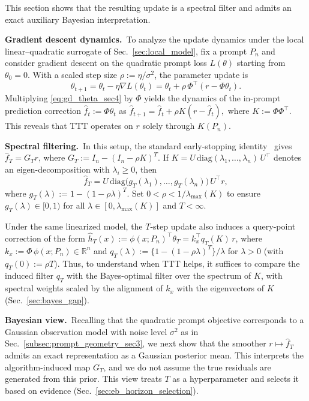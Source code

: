 \documentclass{article}
\theoremstyle{plain}
\theoremstyle{definition}
\theoremstyle{remark}
\begin{document}
This section shows that the resulting update is a spectral filter and admits an exact auxiliary Bayesian interpretation.

\textbf{Gradient descent dynamics.}\,
To analyze the update dynamics under the local linear--quadratic surrogate of Sec.~\ref{sec:local_model}, fix a prompt $P_n$ and consider gradient descent on the quadratic prompt loss $L(\theta)$ starting from $\theta_0=0$. With a scaled step size $\rho:=\eta/\sigma^2$, the parameter update is
\begin{equation}
    \theta_{t+1}
    =\theta_t-\eta\nabla L(\theta_t)
    =\theta_t+\rho\, \Phi^\top(r-\Phi\theta_t).\label{eq:gd_theta_sec4}
\end{equation}
Multiplying \eqref{eq:gd_theta_sec4} by $\Phi$ yields the dynamics of the in-prompt prediction correction $\hat f_t := \Phi\theta_t$ as $\hat f_{t+1} = \hat f_t + \rho K (r-\hat f_t),$ where $K:=\Phi\Phi^\top$. This reveals that TTT operates on $r$ solely through $K(P_n)$.

\textbf{Spectral filtering.}\,
In this setup, the standard early-stopping identity~\citep{YaoRosascoCaponnetto2007EarlyStopping,BauerPereverzevRosasco2007} gives $\hat f_T = G_T r$, where $G_T := I_n-(I_n-\rho K)^T$. If $K=U\,\mathrm{diag}(\lambda_1,\dots,\lambda_n)\,U^\top$ denotes an eigen-decomposition with $\lambda_i\ge 0$, then
\begin{equation}
    \hat f_T =U\,\mathrm{diag}\!\bigl(g_T(\lambda_1),\dots,g_T(\lambda_n)\bigr)\,U^\top r,
\label{eq:spectral_filter_form_sec4}
\end{equation}
where $g_T(\lambda):=1-(1-\rho\lambda)^T$. Set $0<\rho<1/\lambda_{\max}(K)$ to ensure $g_T(\lambda)\in[0,1)$ for all $\lambda\in[0,\lambda_{\max}(K)]$ and $T<\infty$.


Under the same linearized model, the $T$-step update also induces a query-point correction of the form
$\hat h_T(x):=\phi(x;P_n)^\top\theta_T = k_x^\top q_T(K)\,r$, where $k_x:=\Phi\,\phi(x;P_n)\in\mathbb{R}^n$ and
$q_T(\lambda):=\{1-(1-\rho\lambda)^T\}/\lambda$ for $\lambda>0$ (with $q_T(0):=\rho T$). Thus, to understand when TTT helps, it suffices to compare the induced filter $q_T$ with the Bayes-optimal filter over the spectrum of $K$, with spectral weights scaled by the alignment of $k_x$ with the eigenvectors of $K$ (Sec.~\ref{sec:bayes_gap}).

\textbf{Bayesian view.}\,
Recalling that the quadratic prompt objective corresponds to a Gaussian observation model with noise level $\sigma^2$ as in Sec.~\ref{subsec:prompt_geometry_sec3}, we next show that the smoother $r\mapsto \hat f_T$ admits an exact representation as a Gaussian posterior mean. This interprets the algorithm-induced map $G_T$, and we do not assume the true residuals are generated from this prior. This view treats $T$ as a hyperparameter and selects it based on evidence (Sec.~\ref{sec:eb_horizon_selection}).
\end{document}
